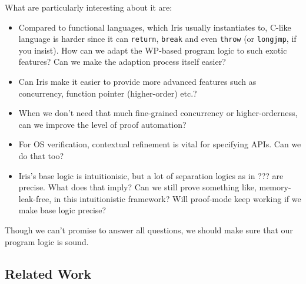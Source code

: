 What are particularly interesting about it are:

\begin{itemize}
\item Compared to functional languages, which Iris usually instantiates to, C-like language is harder since
      it can \texttt{return}, \texttt{break} and even \texttt{throw} (or \texttt{longjmp}, if you insist).
      How can we adapt the WP-based program logic to such exotic features? Can we make the adaption process
      itself easier?
\item Can Iris make it easier to provide more advanced features such as
      concurrency, function pointer (higher-order) etc.?
\item When we don't need that much fine-grained concurrency or higher-orderness, can we improve the level of
      proof automation?
\item For OS verification, contextual refinement is vital for specifying APIs. Can we do that too?
\item Iris's base logic is intuitionisic, but a lot of separation logics as in ??? are precise.
      What does that imply? Can we still prove something like, memory-leak-free, in this intuitionistic
      framework? Will proof-mode keep working if we make base logic precise?
\end{itemize}

Though we can't promise to answer all questions, we should make sure that our program logic is sound.

\subsection{Related Work}
